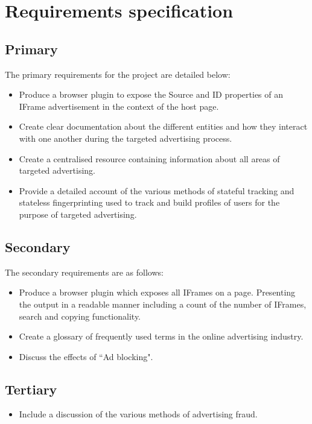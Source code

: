 \documentclass[12pt]{article}
\begin{document}
\section{Requirements specification} \label{requirements}

\subsection{Primary}
The primary requirements for the project are detailed below:
\begin{itemize}
    \item Produce a browser plugin to expose the Source and ID properties of an IFrame advertisement in the context of the host page.
    \item Create clear documentation about the different entities and how they interact with one another during the targeted advertising process.
    \item Create a centralised resource containing information about all areas of targeted advertising.
    \item Provide a detailed account of the various methods of stateful tracking and stateless fingerprinting used to track and build profiles of users for the purpose of targeted advertising.
\end{itemize}

\subsection{Secondary}
The secondary requirements are as follows:
\begin{itemize}
    \item Produce a browser plugin which exposes all IFrames on a page. Presenting the output in a readable manner including a count of the number of IFrames, search and copying functionality. 
    \item Create a glossary of frequently used terms in the online advertising industry.
    \item Discuss the effects of ``Ad blocking". 
\end{itemize}

\subsection{Tertiary}
\begin{itemize}
    \item Include a discussion of the various methods of advertising fraud.
\end{itemize}
\end{document}
